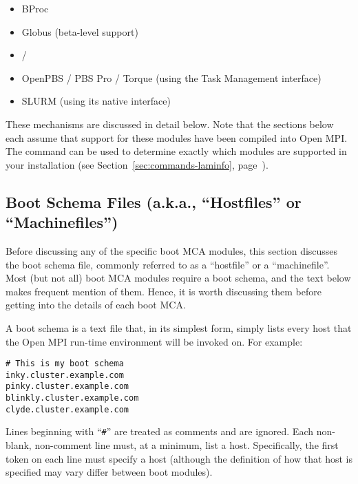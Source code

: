 \begin{itemize}
\item BProc
\item Globus (beta-level support)
\item {} / 
\item OpenPBS / PBS Pro / Torque (using the Task Management interface)
\item SLURM (using its native interface)
\end{itemize}

These mechanisms are discussed in detail below.  Note that the
sections below each assume that support for these modules have been
compiled into Open MPI.  The  command can be used to
determine exactly which modules are supported in your installation
(see Section~\ref{sec:commands-laminfo},
page~\pageref{sec:commands-laminfo}).


\subsection{Boot Schema Files (a.k.a., ``Hostfiles'' or
  ``Machinefiles'')}
\label{sec:mca-orte-pls-schema}

Before discussing any of the specific boot MCA modules, this section
discusses the boot schema file, commonly referred to as a ``hostfile''
or a ``machinefile''.  Most (but not all) boot MCA modules require a
boot schema, and the text below makes frequent mention of them.
Hence, it is worth discussing them before getting into the details of
each boot MCA.

A boot schema is a text file that, in its simplest form, simply lists
every host that the Open MPI run-time environment will be invoked on.  For
example:

\lstset{style=lam-shell}
\begin{lstlisting}
# This is my boot schema
inky.cluster.example.com
pinky.cluster.example.com
blinkly.cluster.example.com
clyde.cluster.example.com
\end{lstlisting}

Lines beginning with ``{\tt \#}'' are treated as comments and are
ignored.  Each non-blank, non-comment line must, at a minimum, list a
host.  Specifically, the first token on each line must specify a host
(although the definition of how that host is specified may vary differ
between boot modules).  

